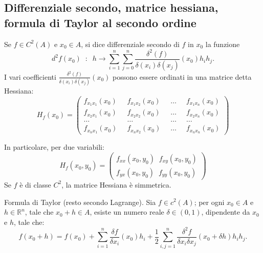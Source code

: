 \subsection*{Differenziale secondo, matrice hessiana, formula di Taylor al secondo ordine}
Se $f \in C^2(A)$ e $x_0 \in A$, si dice differenziale secondo di $f$ in $x_0$ la funzione
\[
    d^2f(x_0) \;\;:\;\; h \rightarrow \sum_{i=1}^{n}\sum_{j=0}^{n}\frac{\delta^2(f)}{\delta(x_i) \delta(x_j)}(x_0)h_ih_j.
\]
I vari coefficienti $\frac{\delta^2(f)}{\delta(x_i) \delta(x_j)}(x_0)$ possono essere ordinati in una matrice detta Hessiana:
\[
    H_f(x_0) =\left(\begin{matrix}
        f_{x_1x_1}(x_0) \;\; &f_{x_1x_2}(x_0) \;\; &\dots \;\; &f_{x_1x_n}(x_0)\\
        f_{x_2x_1}(x_0) \;\; &f_{x_2x_2}(x_0) \;\; &\dots \;\; &f_{x_2x_n}(x_0)\\
        \dots \;\; &\dots \;\; &\dots \;\; &\dots\\
        f_{x_nx_1}(x_0) \;\; &f_{x_nx_2}(x_0) \;\; &\dots \;\; &f_{x_nx_n}(x_0)
    \end{matrix}\right)
\]  
\begin{tcolorbox}
In particolare, per due variabili:
\[
    H_f(x_0, y_0) = \left(\begin{matrix}
        f_{xx}(x_0, y_0) \;\; f_{xy}(x_0, y_0)\\
        f_{yx}(x_0, y_0) \;\; f_{yy}(x_0, y_0)
    \end{matrix}\right)
\]
Se $f$ è di classe $C^2$, la matrice Hessiana è simmetrica.
\end{tcolorbox}
Formula di Taylor (resto secondo Lagrange). Sia $f \in c^2(A)$; per ogni $x_0 \in A$ e $h \in \mathbb{R}^n$, tale che $x_0 + h \in A$, esiste un numero reale $\delta \in (0,1)$, dipendente da $x_0$ e $h$, tale che:
\[
    f(x_0 + h) = f(x_0) +\sum_{i=1}^{n}\frac{\delta f}{\delta x_i}(x_0)h_i + \frac{1}{2}\sum_{i,j=1}^{n}\frac{\delta^2f}{\delta x_i \delta x_j}(x_0 + \delta h) h_i h_j.
\]\newline

